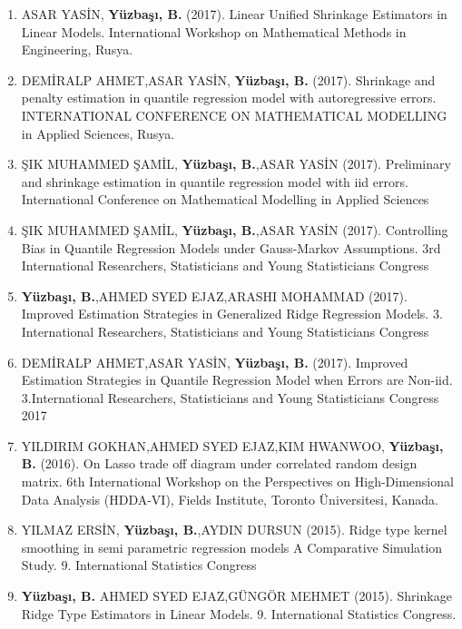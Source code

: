 \documentclass[10pt,a4paper]{article}
\newenvironment{etaremune}{\begin{enumerate}}{\end{enumerate}}
\begin{document}
\begin{etaremune}
\item  ASAR YASİN, {\bf Y\"{u}zba\c{s}{\i}, B.} (2017).  Linear Unified Shrinkage Estimators in Linear Models.  International Workshop on Mathematical Methods in Engineering, Rusya.

\item  DEMİRALP AHMET,ASAR YASİN, {\bf Y\"{u}zba\c{s}{\i}, B.} (2017).  Shrinkage and penalty estimation in quantile regression model with autoregressive errors.  INTERNATIONAL CONFERENCE ON MATHEMATICAL MODELLING in Applied Sciences, Rusya.

\item  ŞIK MUHAMMED ŞAMİL, {\bf Y\"{u}zba\c{s}{\i}, B.},ASAR YASİN (2017).  Preliminary and shrinkage estimation in quantile regression model with iid errors.  International Conference on Mathematical Modelling in Applied Sciences

\item  ŞIK MUHAMMED ŞAMİL, {\bf Y\"{u}zba\c{s}{\i}, B.},ASAR YASİN (2017).  Controlling Bias in Quantile Regression Models under Gauss-Markov Assumptions.  3rd International Researchers, Statisticians and Young Statisticians Congress

\item  {\bf Y\"{u}zba\c{s}{\i}, B.},AHMED SYED EJAZ,ARASHI MOHAMMAD (2017).  Improved Estimation Strategies in Generalized Ridge Regression Models.  3. International Researchers, Statisticians and Young Statisticians Congress

\item  DEMİRALP AHMET,ASAR YASİN, {\bf Y\"{u}zba\c{s}{\i}, B.} (2017).  Improved Estimation Strategies in Quantile Regression Model when Errors are Non-iid.  3.International Researchers, Statisticians and Young Statisticians Congress 2017

\item  YILDIRIM GOKHAN,AHMED SYED EJAZ,KIM HWANWOO, {\bf Y\"{u}zba\c{s}{\i}, B.} (2016).  On Lasso trade off diagram under correlated random design matrix.  6th International Workshop on the Perspectives  on High-Dimensional Data Analysis (HDDA-VI), Fields Institute, Toronto Üniversitesi, Kanada. 

\item  YILMAZ ERSİN, {\bf Y\"{u}zba\c{s}{\i}, B.},AYDIN DURSUN (2015).  Ridge type kernel smoothing in semi  parametric regression models  A Comparative Simulation Study.  9. International Statistics Congress

\item  {\bf Y\"{u}zba\c{s}{\i}, B.} AHMED SYED EJAZ,GÜNGÖR MEHMET (2015).  Shrinkage Ridge Type Estimators in Linear Models.  9. International Statistics Congress.




\end{etaremune}
\end{document}
